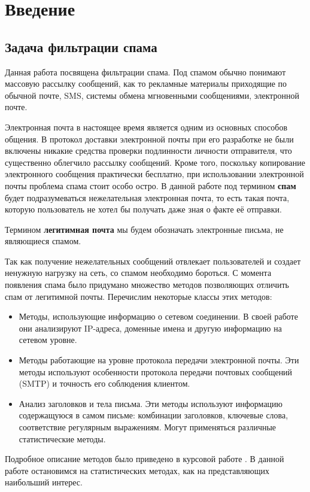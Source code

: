 \newpage
\section{Введение}



\subsection{Задача фильтрации спама}
Данная работа посвящена фильтрации спама. Под спамом обычно понимают массовую рассылку сообщений, как то рекламные материалы приходящие по обычной почте, SMS,  системы обмена мгновенными сообщениями,  электронной почте.

Электронная почта в настоящее время является одним из основных способов общения. В протокол доставки электронной почты при его разработке не были включены никакие средства проверки подлинности личности отправителя, что существенно облегчило рассылку  сообщений. Кроме того, поскольку копирование электронного сообщения практически бесплатно, при использовании электронной почты проблема спама стоит особо остро. В данной работе под термином \textbf{спам} будет подразумеваться нежелательная электронная почта, то есть такая почта, которую пользователь не хотел бы получать даже зная о факте её отправки.

Термином \textbf{легитимная почта} мы будем обозначать электронные письма, не являющиеся спамом.

Так как получение нежелательных сообщений  отвлекает пользователей и создает ненужную нагрузку на сеть, со спамом необходимо бороться. С момента появления спама было придумано множество методов позволяющих отличить спам от легитимной почты. Перечислим некоторые классы этих методов:
\begin{itemize}
\item Методы, использующие информацию о сетевом соединении. В своей работе они анализируют IP-адреса, доменные имена и другую информацию на сетевом уровне.
\item Методы работающие на уровне протокола передачи электронной почты. Эти методы используют особенности протокола передачи почтовых сообщений (SMTP)  и точность его соблюдения клиентом.
\item Анализ заголовков и тела письма. Эти методы используют информацию содержащуюся в самом письме: комбинации заголовков, ключевые слова, соответствие регулярным выражениям. Могут применяться различные статистические методы.
\end{itemize}
Подробное описание методов было приведено в курсовой работе \cite{PETROV10}. В данной работе остановимся на статистических методах, как на представляющих наибольший интерес.
